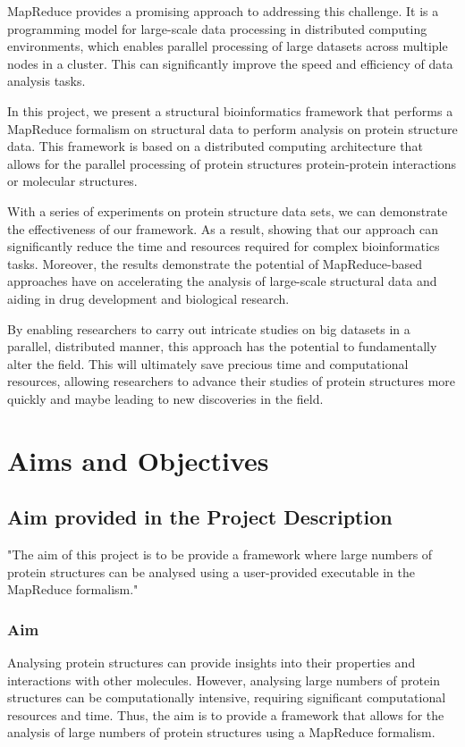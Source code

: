 \documentclass[]{final_report}
\begin{document}
MapReduce provides a promising approach to addressing this challenge. It is a programming model for large-scale data processing in distributed computing environments, which enables parallel processing of large datasets across multiple nodes in a cluster. This can significantly improve the speed and efficiency of data analysis tasks.

In this project, we present a structural bioinformatics framework that performs a MapReduce formalism on structural data to perform analysis on protein structure data. This framework is based on a distributed computing architecture that allows for the parallel processing of protein structures protein-protein interactions or molecular structures.

With a series of experiments on protein structure data sets, we can demonstrate the effectiveness of our framework. As a result, showing that our approach can significantly reduce the time and resources required for complex bioinformatics tasks. Moreover, the results demonstrate the potential of MapReduce-based approaches have on accelerating the analysis of large-scale structural data and aiding in drug development and biological research.

By enabling researchers to carry out intricate studies on big datasets in a parallel, distributed manner, this approach has the potential to fundamentally alter the field. This will ultimately save precious time and computational resources, allowing researchers to advance their studies of protein structures more quickly and maybe leading to new discoveries in the field.
\clearpage

\section{Aims and Objectives}
\subsection{Aim provided in the Project Description}
"The aim of this project is to be provide a framework where large numbers of protein structures can be analysed using a user-provided executable in the MapReduce formalism."

\subsubsection{Aim}
Analysing protein structures can provide insights into their properties and interactions with other molecules. However, analysing large numbers of protein structures can be computationally intensive, requiring significant computational resources and time. Thus, the aim is to provide a framework that allows for the analysis of large numbers of protein structures using a MapReduce formalism.
\end{document}

